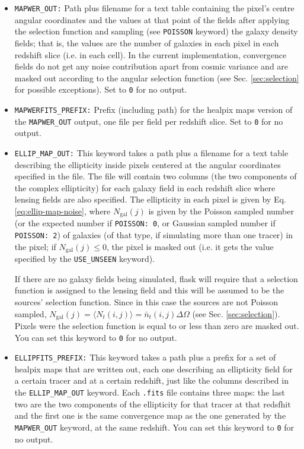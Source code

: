\documentclass[12pt]{book} %
\newcommand{\nv}[1]{\mathrm{#1}}                 %
\begin{document}
\begin{itemize}
\item {\tt MAPWER\_OUT:} Path plus filename for a text table containing the pixel's 
  centre angular coordinates and the values at that point of the fields after applying 
  the selection function and sampling (see {\tt POISSON} keyword) the galaxy density fields; that is, the 
  values are the number of galaxies in each pixel in each redshift slice (i.e. in each 
  cell). In the current implementation, convergence fields do not get any noise contribution 
  apart from cosmic variance and are masked out according to the angular selection 
  function (see Sec. \ref{sec:selection} for possible exceptions). Set to {\tt 0} for no output. 

\item {\tt MAPWERFITS\_PREFIX:} Prefix (including path) for the {\sc healpix} maps version 
  of the {\tt MAPWER\_OUT} output, one file per field per redshift slice. Set to {\tt 0} for no output. 

\item {\tt ELLIP\_MAP\_OUT:} This keyword takes a path plus a filename for a text table 
  describing the ellipticity inside pixels centered at the angular coordinates specified 
  in the file. The file will contain two columns (the two components of the complex 
  ellipticity) for each galaxy field in each redshift slice where lensing fields 
  are also specified. The ellipticity in each pixel is given by Eq. \ref{eq:ellip-map-noise}, 
  where $N_{\nv{gal}}(j)$ is given by the Poisson sampled number (or the expected number if 
  {\tt POISSON: 0}, or Gaussian sampled number if {\tt POISSON: 2}) of galaxies (of that type, if simulating 
  more than one tracer) in the pixel; if $N_{\nv{gal}}(j)\leq 0$, the pixel is masked out (i.e. it gets 
  the value specified by the {\tt USE\_UNSEEN} keyword). 

  If there are no galaxy fields being simulated, {\sc flask} will require that 
  a selection function is assigned to the lensing field and this will be assumed 
  to be the sources' selection function. Since in this case the sources are not Poisson 
  sampled, $N_{\nv{gal}}(j)=\langle N_t(i,j) \rangle = \bar{n}_t(i,j)\Delta\Omega$ 
  (see Sec. \ref{sec:selection}). Pixels were the selection function is equal to or 
  less than zero are masked out. You can set this keyword to {\tt 0} for no output.
  
\item {\tt ELLIPFITS\_PREFIX:} This keyword takes a path plus a prefix for a set of 
  {\sc healpix} maps that are written out, each one describing an ellipticity field for a certain tracer and 
  at a certain redshift, just like the columns described in the {\tt ELLIP\_MAP\_OUT} 
  keyword. Each {\tt .fits} file contains three maps: the last two are the two components 
  of the ellipticity for that tracer at that redsfhit and the first one is the same convergence map 
  as the one generated by the {\tt MAPWER\_OUT} keyword, at the same redshift. 
  You can set this keyword to {\tt 0} for no output.


\end{itemize}
\end{document}
